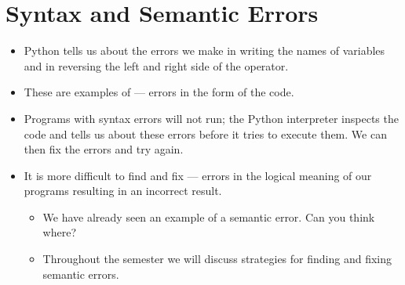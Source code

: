 \documentclass[letterpaper,10pt,english]{sphinxmanual}
\begin{document}
\section{Syntax and Semantic Errors}
\label{\detokenize{lecture_notes/lec02_calculator:syntax-and-semantic-errors}}\begin{itemize}
\item {} 
Python tells us about the errors we make in writing the names of
variables and in reversing the left and right side of the \sphinxcode{\sphinxupquote{=}}
operator.

\item {} 
These are examples of  — errors in the form of the
code.

\item {} 
Programs with syntax errors will not run; the Python interpreter
inspects the code and tells us about these errors before it tries to
execute them. We can then fix the errors and try again.

\item {} 
It is more difficult to find and fix  — errors in the
logical meaning of our programs resulting in an incorrect result.
\begin{itemize}
\item {} 
We have already seen an example of a semantic error. Can you think
where?

\item {} 
Throughout the semester we will discuss strategies for finding and
fixing semantic errors.

\end{itemize}

\end{itemize}
\end{document}
